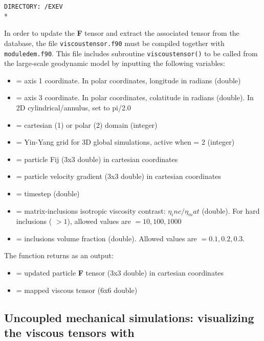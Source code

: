 \texttt{DIRECTORY: /EXEV}\\*

In order to update the \textbf{F} tensor and extract the associated \pmb{$\eta$} tensor from the database, the file \texttt{viscoustensor.f90} must be compiled together with \texttt{moduledem.f90}. This file includes subroutine \texttt{viscoustensor()} to be called from the large-scale geodynamic model by inputting the following variables:

\begin{itemize}
    \item[]  = axis 1 coordinate. In polar coordinates, longitude in radians (double)
    \item[]  = axis 3 coordinate. In polar coordinates, colatitude in radians (double). In 2D cylindrical/annulus, set to pi/2.0 
    \item[]  = cartesian (1) or polar (2) domain (integer)
    \item[]  = Yin-Yang grid for 3D global simulations, active when = 2 (integer)
    \item[]  = particle Fij (3x3 double) in cartesian coordinates       
    \item[]  = particle velocity gradient (3x3 double) in cartesian coordinates
    \item[]  = timestep (double)                
    \item[]  = matrix-inclusions isotropic viscosity contrast: $\eta_inc/\eta_mat$ (double). For hard inclusions ( $ > 1$), allowed values are $ = 10, 100, 1000$
    \item[]  = inclusions volume fraction (double). Allowed values are  $= 0.1, 0.2, 0.3$.
\end{itemize}

The function returns as an output:
\begin{itemize}
    \item[]   = updated particle \textbf{F} tensor (3x3 double) in cartesian coordinates      
    \item[]  = mapped viscous tensor (6x6 double)
\end{itemize}


\vfill{}

\subsection{Uncoupled mechanical simulations: visualizing the viscous tensors with \vizvisctitle{}}

